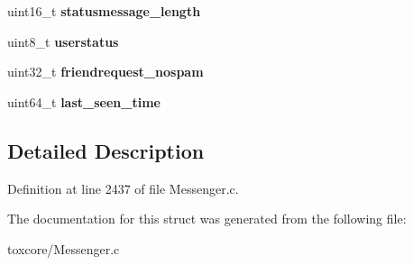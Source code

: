 \begin{DoxyCompactItemize}
\item 
\hypertarget{struct_s_a_v_e_d___f_r_i_e_n_d_a43fe9dde52dc12e90933150eca91c0c3}{uint16\+\_\+t {\bfseries statusmessage\+\_\+length}}\label{struct_s_a_v_e_d___f_r_i_e_n_d_a43fe9dde52dc12e90933150eca91c0c3}

\item 
\hypertarget{struct_s_a_v_e_d___f_r_i_e_n_d_a6985227ceff68d0298d6ee9e09316945}{uint8\+\_\+t {\bfseries userstatus}}\label{struct_s_a_v_e_d___f_r_i_e_n_d_a6985227ceff68d0298d6ee9e09316945}

\item 
\hypertarget{struct_s_a_v_e_d___f_r_i_e_n_d_a0fae9801a4789a368f90125119e31f3f}{uint32\+\_\+t {\bfseries friendrequest\+\_\+nospam}}\label{struct_s_a_v_e_d___f_r_i_e_n_d_a0fae9801a4789a368f90125119e31f3f}

\item 
\hypertarget{struct_s_a_v_e_d___f_r_i_e_n_d_a8f99c48eb6b3ea472806495135ab6792}{uint64\+\_\+t {\bfseries last\+\_\+seen\+\_\+time}}\label{struct_s_a_v_e_d___f_r_i_e_n_d_a8f99c48eb6b3ea472806495135ab6792}

\end{DoxyCompactItemize}


\subsection{Detailed Description}


Definition at line 2437 of file Messenger.\+c.



The documentation for this struct was generated from the following file\+:\begin{DoxyCompactItemize}
\item 
toxcore/Messenger.\+c\end{DoxyCompactItemize}
